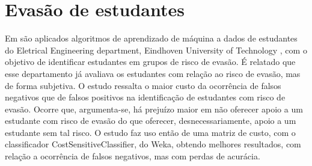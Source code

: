\chapter{Evasão de estudantes}

Em \cite{EDM_pred_dropout} são aplicados algoritmos de aprendizado de máquina a dados de estudantes do Eletrical Engineering department, Eindhoven University of Technology , com o objetivo de identificar estudantes em grupos de risco de evasão. É relatado que esse departamento já avaliava os estudantes com relação ao risco de evasão, mas de forma subjetiva. O estudo ressalta o maior custo da ocorrência de falsos negativos que de falsos positivos na identificação de estudantes com risco de evasão. Ocorre que, argumenta-se, há prejuízo maior em não oferecer apoio a um estudante com risco de evasão do que oferecer, desnecessariamente, apoio a um estudante sem tal risco. O estudo faz uso então de uma matriz de custo, com o classificador CostSensitiveClassifier, do Weka, obtendo melhores resultados, com relação a ocorrência de falsos negativos, mas com perdas de acurácia. 

\cite{EDM_review_and_soa} 
\cite{EDM_retention} 
\cite{EDM_education}
\cite{EDM_dropout_rates}
\cite{EDM_ufrj}
\cite{EDM_ufrj2}
\cite{EDM_brasil}
